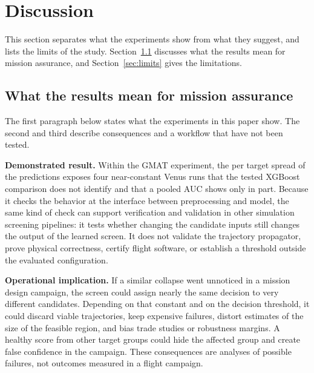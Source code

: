\section{Discussion}
\label{sec:discussion}

This section separates what the experiments show from what they suggest, and lists the limits of the study. Section~\ref{sec:assurance} discusses what the results mean for mission assurance, and Section~\ref{sec:limits} gives the limitations.

\subsection{What the results mean for mission assurance}
\label{sec:assurance}

The first paragraph below states what the experiments in this paper show. The second and third describe consequences and a workflow that have not been tested.

\textbf{Demonstrated result.} Within the GMAT experiment, the per target spread of the predictions exposes four near-constant Venus runs that the tested XGBoost comparison does not identify and that a pooled AUC shows only in part. Because it checks the behavior at the interface between preprocessing and model, the same kind of check can support verification and validation in other simulation screening pipelines: it tests whether changing the candidate inputs still changes the output of the learned screen. It does not validate the trajectory propagator, prove physical correctness, certify flight software, or establish a threshold outside the evaluated configuration.

\textbf{Operational implication.} If a similar collapse went unnoticed in a mission design campaign, the screen could assign nearly the same decision to very different candidates. Depending on that constant and on the decision threshold, it could discard viable trajectories, keep expensive failures, distort estimates of the size of the feasible region, and bias trade studies or robustness margins. A healthy score from other target groups could hide the affected group and create false confidence in the campaign. These consequences are analyses of possible failures, not outcomes measured in a flight campaign.

